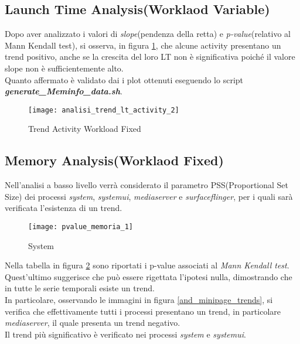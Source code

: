 \clearpage

\subsection{Launch Time Analysis(Worklaod Variable)}
Dopo aver analizzato i valori di \textit{slope}(pendenza della retta) e
\textit{p-value}(relativo al Mann Kendall test), si osserva, in figura \ref{and_analisi_trend_lt_activity_2},
che alcune activity presentano un trend positivo, anche se la crescita
del loro LT non è significativa poiché il valore slope non è sufficientemente
alto.\\
Quanto affermato è validato dai i plot ottenuti eseguendo lo script
\textit{\textbf{generate\_Meminfo\_data.sh}}.

\begin{figure}[!htbp]
  \centering
  \texttt{[image: analisi\_trend\_lt\_activity\_2]}
  \caption{Trend Activity Workload Fixed}
  \label{and_analisi_trend_lt_activity_2}
\end{figure}

\clearpage

\subsection{Memory Analysis(Worklaod Fixed)}

Nell'analisi a basso livello verrà considerato il parametro PSS(Proportional Set Size)
dei processi \textit{system}, \textit{systemui}, \textit{mediaserver} e
\textit{surfaceflinger}, per i quali sarà verificata l'esistenza di un trend.\\

\begin{figure}[!htbp]
  \centering
  \texttt{[image: pvalue\_memoria\_1]}
  \caption{System}
  \label{and_pvalue_memoria_1}
\end{figure}

Nella tabella in figura \ref{and_pvalue_memoria_1} sono riportati i p-value associati
al \textit{Mann Kendall test}.\\
Quest'ultimo suggerisce che può essere rigettata l'ipotesi nulla, dimostrando
che in tutte le serie temporali esiste un trend.\\
In particolare, osservando le immagini in figura \ref{and_minipage_trends}, si verifica che effettivamente
tutti i processi presentano un trend, in particolare \textit{mediaserver},
il quale presenta un trend negativo.\\
Il trend più significativo è verificato nei processi \textit{system} e \textit{systemui}.

